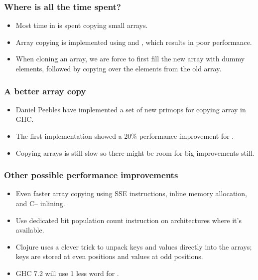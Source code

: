 \documentclass[xetex,mathserif,serif]{beamer}
\newcommand{\code}[1]{\mbox{\texttt{\small{\color{CodeColor}{#1}}}}}
\begin{document}
\begin{frame}
  \frametitle{Where is all the time spent?}

  \begin{itemize}
  \item Most time in \code{insert} is spent copying small arrays.
  \item Array copying is implemented using \code{indexArray\#}
    and \code{writeArray\#}, which results in poor performance.
  \item When cloning an array, we are force to first fill the new
    array with dummy elements, followed by copying over the elements
    from the old array.
  \end{itemize}
\end{frame}

\begin{frame}
  \frametitle{A better array copy}

  \begin{itemize}
  \item Daniel Peebles have implemented a set of new primops for
    copying array in GHC.
  \item The first implementation showed a 20\% performance improvement
    for \code{insert}.
  \item Copying arrays is still slow so there might be room for big
    improvements still.
  \end{itemize}
\end{frame}

\begin{frame}
  \frametitle{Other possible performance improvements}
  \begin{itemize}
  \item Even faster array copying using SSE instructions, inline
    memory allocation, and C-- inlining.
  \item Use dedicated bit population count instruction on
    architectures where it's available.
  \item Clojure uses a clever trick to unpack keys and values directly
    into the arrays; keys are stored at even positions and values at
    odd positions.
  \item GHC 7.2 will use 1 less word for \code{Array}.
  \end{itemize}
\end{frame}
\end{document}
